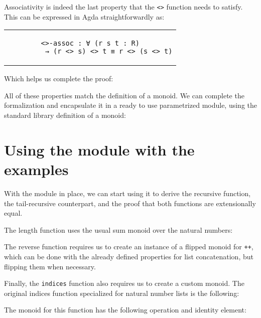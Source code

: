 \documentclass[runningheads]{llncs}
\begin{document}
Associativity is indeed the last property that the \lstinline{<>} function needs to
satisfy. This can be expressed in Agda straightforwardly as:

\begin{center}
\begin{tabular}{c}
\begin{lstlisting}
<>-assoc : ∀ (r s t : R)
         → (r <> s) <> t ≡ r <> (s <> t)
\end{lstlisting}
\end{tabular}
\end{center}

Which helps us complete the proof:



All of these properties match the definition of a monoid. We can complete the
formalization and encapsulate it in a ready to use parametrized module, using the
standard library definition of a monoid:



\section{Using the module with the examples}

With the module in place, we can start using it to derive the recursive function, the
tail-recursive counterpart, and the proof that both functions are extensionally equal.

The length function uses the usual sum monoid over the natural numbers:



The reverse function requires us to create an instance of a flipped monoid for
\lstinline{++}, which can be done with the already defined properties for list
concatenation, but flipping them when necessary.



Finally, the \lstinline{indices} function also requires us to create a custom monoid. The
original indices function specialized for natural number lists is the following:



The monoid for this function has the following operation and identity element:
\end{document}
